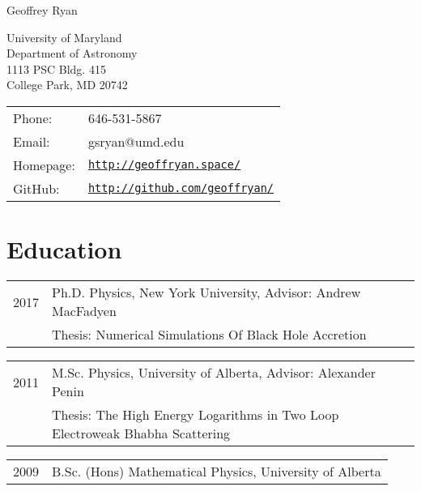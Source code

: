 \documentclass[letterpaper]{article}
\def\name{Geoffrey Ryan}
\renewenvironment{itemize}{
  \begin{list}{}{
    \setlength{\leftmargin}{1.5em}
  }
}{
  \end{list}
}
\begin{document}
{\huge \name}


\vspace{0.25in}

\begin{minipage}{0.45\linewidth}
  University of Maryland \\
  Department of Astronomy\\
  1113 PSC Bldg. 415\\
  College Park, MD 20742
\end{minipage}
\begin{minipage}{0.45\linewidth}
  \begin{tabular}{ll}
    Phone: & 646-531-5867 \\
    Email: &  gsryan@umd.edu \\
    Homepage: & \href{http://geoffryan.space/}{\tt http://geoffryan.space/} \\
    GitHub: & \href{http://github.com/geoffryan/}{\tt http://github.com/geoffryan/} \\
  \end{tabular}
\end{minipage}

\section*{Education}
\begin{itemize}
\item \begin{tabular}{ll}
2017 & Ph.D. Physics, New York University, Advisor: Andrew MacFadyen \\
	& Thesis: Numerical Simulations Of Black Hole Accretion
\end{tabular}

\item \begin{tabular}{ll}
2011 &  M.Sc. Physics, University of Alberta, Advisor: Alexander Penin \\
	& Thesis: The High Energy Logarithms in Two Loop Electroweak Bhabha Scattering
\end{tabular}

\item \begin{tabular}{ll}
2009 &  B.Sc. (Hons) Mathematical Physics, University of Alberta \\
\end{tabular}
\end{itemize}
\end{document}
